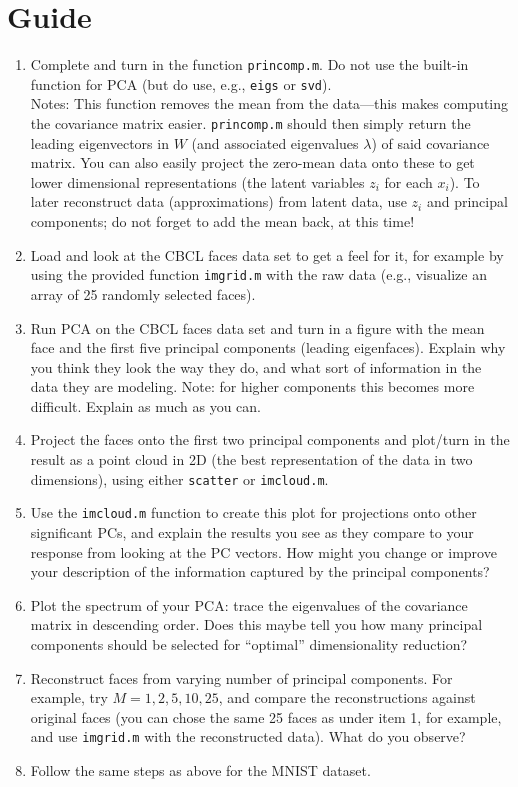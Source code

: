 \documentclass[11pt,noanswers,addpoints]{exam}
\begin{document}
\section{Guide}

\begin{enumerate}
\item Complete and turn in the function \texttt{princomp.m}. Do not use the built-in function
for PCA (but do use, e.g., \texttt{eigs} or \texttt{svd}).\\
Notes: This function removes the mean from the data---this makes computing the covariance matrix easier. \texttt{princomp.m} should then simply return the leading eigenvectors in $W$ (and associated eigenvalues $\lambda$) of said covariance matrix. You can also easily project the zero-mean data onto these to get lower dimensional representations (the latent variables $z_i$ for each $x_i$). To later reconstruct data (approximations) from latent data, use $z_i$ and principal components; do not forget to add the mean back, at this time!



\item Load and look at the CBCL faces data set to get a feel for it, for example by using 
the provided function \texttt{imgrid.m} with the raw data (e.g., visualize an array of 25 randomly selected faces). 
\item Run PCA on the CBCL faces data set and turn in a figure with the mean face and the first
five principal components (leading eigenfaces). Explain why you think they look the way they do, 
and what sort of information in the data they are modeling. Note: for higher 
components this becomes more difficult. Explain as much as you can.
\item Project the faces onto the first two principal components and plot/turn in the
result as a point cloud in 2D (the best representation of the data in two dimensions), 
using either \texttt{scatter} or \texttt{imcloud.m}. 
\item Use the \texttt{imcloud.m} function to create this plot for
projections onto other significant PCs, and explain the
results you see as they compare to your response from looking at the PC vectors. How might you change
or improve your description of the information captured by the principal components?
\item Plot the spectrum of your PCA: trace the eigenvalues of the covariance matrix in descending order. Does this maybe tell you how many principal components should be selected for ``optimal'' dimensionality reduction?
\item Reconstruct faces from varying number of principal components. For example, try $M=1,2,5,10,25$, and compare the reconstructions against original faces (you can chose the same 25 faces as under item 1, for example, and use  \texttt{imgrid.m} with the reconstructed data). What do you observe?
\item Follow the same steps as above for the MNIST dataset. 
\end{enumerate}
\end{document}
